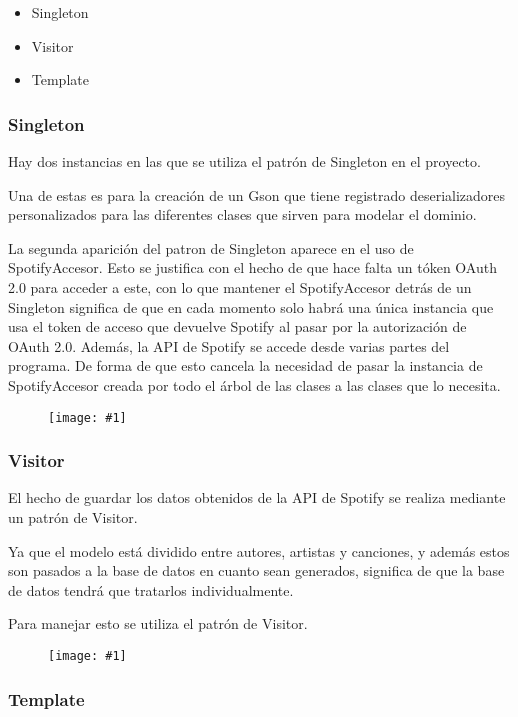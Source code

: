 \documentclass{article}
\newcommand{\cimg}[2]{
\begin{figure}[H]
	\center
		\texttt{[image: \#1]}
\end{figure}
}
\begin{document}
\begin{itemize}
	\item Singleton
	\item Visitor
	\item Template
\end{itemize}

\newpage

\subsubsection{Singleton}

Hay dos instancias en las que se utiliza el patrón de Singleton en el proyecto.

Una de estas es para la creación de un Gson que tiene registrado deserializadores personalizados
para las diferentes clases que sirven para modelar el dominio.

La segunda aparición del patron de Singleton aparece en el uso de SpotifyAccesor.
Esto se justifica con el hecho de que hace falta un tóken OAuth 2.0 para acceder a este,
con lo que mantener el SpotifyAccesor detrás de un Singleton significa de que en cada momento solo habrá una única
instancia que usa el token de acceso que devuelve Spotify al pasar por la autorización de OAuth 2.0.
Además, la API de Spotify se accede desde varias partes del programa. De forma de que esto cancela la necesidad de pasar
la instancia de SpotifyAccesor creada por todo el árbol de las clases a las clases que lo necesita.

\cimg{singleton.png}{1}

\newpage

\subsubsection{Visitor}

El hecho de guardar los datos obtenidos de la API de Spotify se realiza mediante un patrón de Visitor.

Ya que el modelo está dividido entre autores, artistas y canciones,
y además estos son pasados a la base de datos
en cuanto sean generados, significa de que la base de datos tendrá
que tratarlos individualmente.

Para manejar esto se utiliza el patrón de Visitor.

\cimg{visitor.png}{0.9}

\newpage

\subsubsection{Template}
\end{document}
